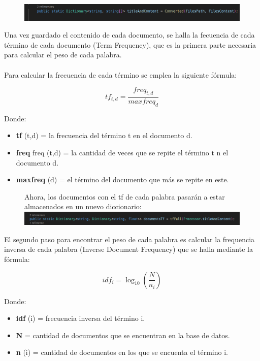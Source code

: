 \documentclass[12 pt]{article}
\begin{document}
\begin{figure}[h] 
    \includegraphics[width = 0.9\linewidth]{titleAndContent.png} 
\end{figure}


\vspace{0.6 cm}

Una vez guardado el contenido de cada documento, se halla la fecuencia de
cada término de cada documento (Term Frequency), que es la primera parte
necesaria para calcular el peso de cada palabra.\\
\\
Para calcular la frecuencia de cada término se emplea la siguiente fórmula:

\begin{equation}
    tf_{t,d} = \frac{freq_{t,d}}{maxf req_d}
\end{equation}

\large Donde:
\begin{itemize}
    \item \small \textbf{tf} (t,d) = la frecuencia del término t en el documento d.
    \item \small \textbf{freq} freq (t,d) = la cantidad de veces que se repite el
    término t n el documento d.
    \item \small \textbf{maxfreq} (d) = el término del documento que más se repite
    en este. 
\end{itemize}

\begin{figure}[h]
	Ahora, los documentos con el tf de cada palabra pasarán a estar
	almacenados en un nuevo diccionario:\\
	\newline
	\includegraphics[width =0.9 \linewidth] {TF.png}
\end{figure}

El segundo paso para encontrar el peso de cada palabra es calcular la
frequencia inversa de cada palabra (Inverse Document Frequency) que se halla
mediante la fórmula:

\begin{equation}
    idf_i = \log_{10} (\frac{N}{n_i})
\end{equation}

Donde:
\begin{itemize}
    \item \small \textbf{idf} (i) = frecuencia inversa del término i.
    \item \small \textbf{N} = cantidad de documentos que se encuentran en la
    base de datos.
    \item \small \textbf{n} (i) = cantidad de documentos en los que se
    encuenta el término i.
\end{itemize}
\end{document}
